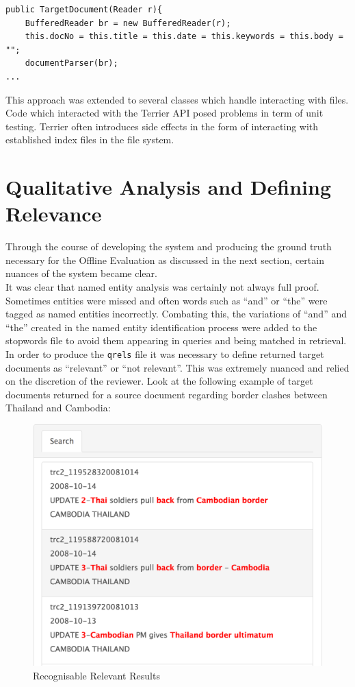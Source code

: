 \documentclass{l4proj}
\newcommand{\code}[1]{\texttt{#1}}
\begin{document}
\begin{verbatim}
public TargetDocument(Reader r){
    BufferedReader br = new BufferedReader(r);
    this.docNo = this.title = this.date = this.keywords = this.body = "";
    documentParser(br);
...
\end{verbatim}

This approach was extended to several classes which handle interacting with files.
Code which interacted with the Terrier API posed problems in term of unit testing. Terrier often introduces side effects in the form of interacting with established index files in the file system.
\section{Qualitative Analysis and Defining Relevance}
Through the course of developing the system and producing the ground truth necessary for the Offline Evaluation as discussed in the next section, certain nuances of the system became clear. \\
It was clear that named entity analysis was certainly not always full proof. Sometimes entities were missed and often words such as ``and'' or ``the'' were tagged as named entities incorrectly. Combating this, the variations of ``and'' and ``the'' created in the named entity identification process were added to the stopwords file to avoid them appearing in queries and being matched in retrieval. \\
In order to produce the \code{qrels} file it was necessary to define returned target documents as ``relevant'' or ``not relevant''. This was extremely nuanced and relied on the discretion of the reviewer. Look at the following example of target documents returned for a source document regarding border clashes between Thailand and Cambodia:
\begin{figure}[H]
\centering
\includegraphics[scale=0.30]{images/good_results}
\caption{Recognisable Relevant Results}
\label{relevant_results}
\end{figure}
\end{document}

